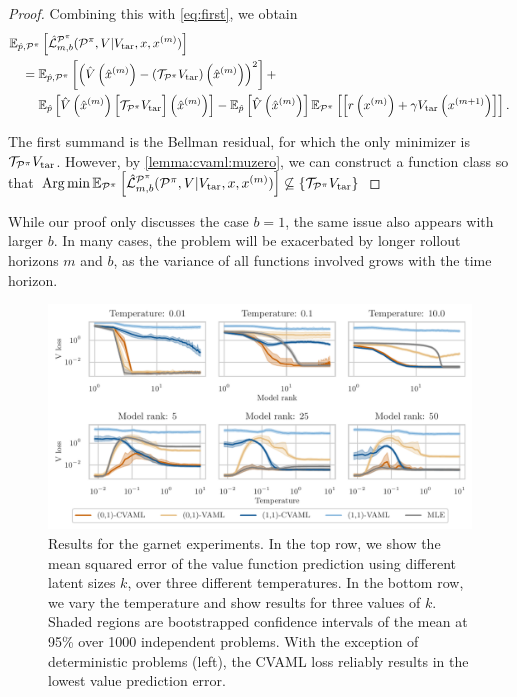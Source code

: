 \begin{proof}
Combining this with \autoref{eq:first}, we obtain
%
\begin{align}
  &\EEX{\hat{p},\P^\pi}{\hat{\mathcal{L}}^{\P^\pi}_{m,b}(\P^\pi, V| V_{\mathrm{tar}}, x, x^{(m)})}\\
  &\quad = \EEX{\hat{p},\P^\pi}{ \roundb{\hat{V}\roundb{\mx{m}} - \roundb{\mathcal{T}_{\P^\pi}V_\mathrm{tar}}\roundb{\mx{m}}}^2} + \\
  &~ \quad \quad \EEX{\hat{p}}{ \hat{V}\roundb{\mx{m}}\target{m}} - \EEX{\hat{p}}{\hat{V}\roundb{\mx{m}}} \EEX{\P^\pi}{\TrV{m}}.
\end{align}

The first summand is the Bellman residual, for which the only minimizer is $\mathcal{T}_{\P^\pi}V_\mathrm{tar}$.
However, by \autoref{lemma:cvaml:muzero}, we can construct a function class so that $\Argmin \EEX{\P^\pi}{\hat{\mathcal{L}}^{\P^\pi}_{m,b}(\P^\pi, V| V_{\mathrm{tar}}, x, x^{(m)})} \not \subseteq \{\mathcal{T}_{\P^\pi}V_\mathrm{tar}\}$
\end{proof}

While our proof only discusses the case $b=1$, the same issue also appears with larger $b$.
In many cases, the problem will be exacerbated by longer rollout horizons $m$ and $b$, as the variance of all functions involved grows with the time horizon.


\begin{figure}[t]
    \centering
    \includegraphics[width=.9\linewidth]{figures/lambda/plts/v_loss_comparison.pdf}
    \caption{Results for the garnet experiments. 
    In the top row, we show the mean squared error of the value function prediction using different latent sizes $k$, over three different temperatures. 
    In the bottom row, we vary the temperature and show results for three values of $k$. 
    Shaded regions are bootstrapped confidence intervals of the mean at 95\% over 1000 independent problems. 
    With the exception of deterministic problems (left), the CVAML loss reliably results in the lowest value prediction error. }
    \label{fig:cvaml:garnet}
\end{figure}


